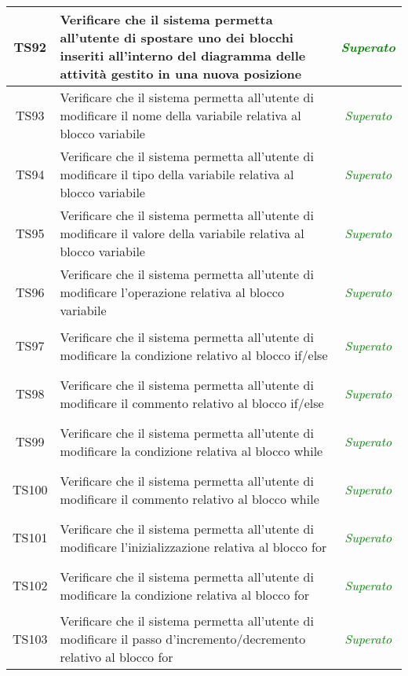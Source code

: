 \begin{longtable}{|c|>{}m{8cm}|c|}
\hypertarget{TS4.19}{TS92} & Verificare che il sistema permetta all'utente di spostare uno dei blocchi inseriti all'interno del diagramma delle attività gestito in una nuova posizione & \textcolor{Green}{\textit{Superato}}\\ \hline
\hypertarget{TS4.20.1}{TS93} & Verificare che il sistema permetta all'utente di modificare il nome della variabile relativa al blocco variabile & \textcolor{Green}{\textit{Superato}}\\ \hline
\hypertarget{TS4.20.2}{TS94} & Verificare che il sistema permetta all'utente di modificare il tipo della variabile relativa al blocco variabile & \textcolor{Green}{\textit{Superato}}\\ \hline
\hypertarget{TS4.20.3}{TS95} & Verificare che il sistema permetta all'utente di modificare il valore della variabile relativa al blocco variabile & \textcolor{Green}{\textit{Superato}}\\ \hline
\hypertarget{TS4.20.4}{TS96} & Verificare che il sistema permetta all'utente di modificare l'operazione relativa al blocco variabile & \textcolor{Green}{\textit{Superato}}\\ \hline
\hypertarget{TS4.22.1}{TS97} & Verificare che il sistema permetta all'utente di modificare la condizione relativo al blocco if/else & \textcolor{Green}{\textit{Superato}}\\ \hline
\hypertarget{TS4.22.2}{TS98} & Verificare che il sistema permetta all'utente di modificare il commento relativo al blocco if/else & \textcolor{Green}{\textit{Superato}}\\ \hline
\hypertarget{TS4.23.1}{TS99} & Verificare che il sistema permetta all'utente di modificare la condizione relativa al blocco while & \textcolor{Green}{\textit{Superato}}\\ \hline
\hypertarget{TS4.23.2}{TS100} & Verificare che il sistema permetta all'utente di modificare il commento relativo al blocco while & \textcolor{Green}{\textit{Superato}}\\ \hline
\hypertarget{TS4.24.1}{TS101} & Verificare che il sistema permetta all'utente di modificare l'inizializzazione relativa al blocco for & \textcolor{Green}{\textit{Superato}}\\ \hline
\hypertarget{TS4.24.2}{TS102} & Verificare che il sistema permetta all'utente di modificare la condizione relativa al blocco for & \textcolor{Green}{\textit{Superato}}\\ \hline
\hypertarget{TS4.24.3}{TS103} & Verificare che il sistema permetta all'utente di modificare il passo d'incremento/decremento relativo al blocco for & \textcolor{Green}{\textit{Superato}}\\ \hline

\end{longtable}
